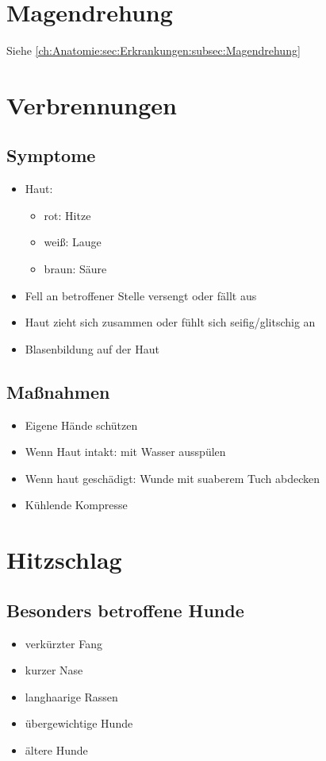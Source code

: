 \section{Magendrehung}
    Siehe \ref{ch:Anatomie:sec:Erkrankungen:subsec:Magendrehung}


\section{Verbrennungen}
    \subsection{Symptome}
        \begin{itemize}
            \item Haut:
            \begin{itemize}
                \item rot: Hitze
                \item weiß: Lauge
                \item braun: Säure
            \end{itemize}
            \item Fell an betroffener Stelle versengt oder fällt aus
            \item Haut zieht sich zusammen oder fühlt sich seifig/glitschig an
            \item Blasenbildung auf der Haut
        \end{itemize}

    \subsection{Maßnahmen}
        \begin{itemize}
            \item Eigene Hände schützen
            \item Wenn Haut intakt: mit Wasser ausspülen
            \item Wenn haut geschädigt: Wunde mit suaberem Tuch abdecken
            \item Kühlende Kompresse
        \end{itemize}

\section{Hitzschlag}
    \subsection {Besonders betroffene Hunde}
        \begin{itemize}
            \item verkürzter Fang
            \item kurzer Nase
            \item langhaarige Rassen
            \item übergewichtige Hunde
            \item ältere Hunde
        \end{itemize}
